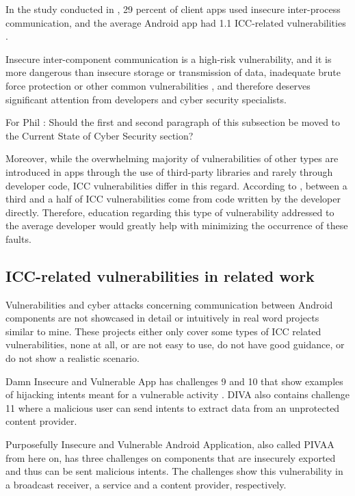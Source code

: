     	In the study conducted in \cite{pt_mobile_apps_2019}, 29 percent of client apps used insecure inter-process communication, and the average Android app had 1.1 ICC-related vulnerabilities \cite{pt_mobile_apps_2019}.
    	
    	Insecure inter-component communication is a high-risk vulnerability, and it is more dangerous than insecure storage or transmission of data, inadequate brute force protection or other common vulnerabilities \cite{pt_mobile_apps_2019}, and therefore deserves significant attention from developers and cyber security specialists.
		
		For Phil : Should the first and second paragraph of this subsection be moved to the Current State of Cyber Security section? 
		
		Moreover, while the overwhelming majority of vulnerabilities of other types are introduced in apps through the use of third-party libraries and rarely through developer code, ICC vulnerabilities differ in this regard. According to \cite{android_vulnerabilities_evolution}, between a third and a half of ICC vulnerabilities come from code written by the developer directly. Therefore, education regarding this type of vulnerability addressed to the average developer would greatly help with minimizing the occurrence of these faults.
		
		\subsection{ICC-related vulnerabilities in related work}
		    \label{subsec:ICC_related_work}
		
		Vulnerabilities and cyber attacks concerning communication between Android components are not showcased in detail or intuitively in real word projects similar to mine. These projects either only cover some types of ICC related vulnerabilities, none at all, or are not easy to use, do not have good guidance, or do not show a realistic scenario.
		
		Damn Insecure and Vulnerable App has challenges 9 and 10 that show examples of hijacking intents meant for a vulnerable activity \cite{diva_walkthrough}. DIVA also contains challenge 11 where a malicious user can send intents to extract data from an unprotected content provider. 
		
		Purposefully Insecure and Vulnerable Android Application, also called PIVAA from here on, has three challenges on components that are insecurely exported and thus can be sent malicious intents. The challenges show this vulnerability in a broadcast receiver, a service and a content provider, respectively.
		
